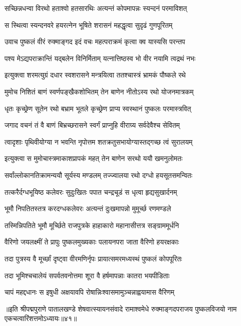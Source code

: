 \twolineshloka
{सच्छिन्नधन्वा विरथो हताश्वो हतसारथिः}
{अत्यन्तं कोपमापन्नः स्यन्दनं परमाविशत्}%

\twolineshloka
{स स्थित्वा स्यन्दनवरे हयरत्नेन भूषिते}
{शरासनं महद्धृत्वा सुदृढं गुणपूरितम्}%

\twolineshloka
{उवाच पुष्कलं वीरं रुक्माङ्गद इदं वचः}
{महत्पराक्रमं कृत्वा क्व यास्यसि परन्तप}%

\twolineshloka
{पश्य मेऽद्यपराक्रान्तिं यद्बलेन विनिर्मिताम्}
{यत्नात्तिष्ठस्व भो वीर नयामि त्वद्रथं नभः}%

\twolineshloka
{इत्युक्त्वा शरमत्युग्रं दधार स्वशरासने}
{मन्त्रयित्वा ततश्चास्त्रं भ्रामकं पौष्कले रथे}%

\twolineshloka
{मुमोच निशितं बाणं स्वर्णपङ्खैकशोभितम्}
{तेन बाणेन नीतोऽस्य रथो योजनमात्रकम्}%

\twolineshloka
{धृतः कृच्छ्रेण सूतेन रथो बभ्राम भूतले}
{कृच्छ्रेण प्राप्य स्वस्थानं पुष्कलः परमास्त्रवित्}%

\twolineshloka
{जगाद वचनं तं वै बाणं बिभ्रच्छरासने}
{स्वर्गं प्राप्नुहि वीराग्र्य सर्वदेवैश्च सेवितम्}%

\twolineshloka
{त्वादृशाः पृथिवीयोग्या न भवन्ति नृपोत्तम}
{शतक्रतुसभायोग्यास्तद्गच्छ त्वं सुरालयम्}%

\twolineshloka
{इत्युक्त्वा स मुमोचास्त्रमाकाशप्रापकं महत्}
{तेन बाणेन सरथो ययौ खमनुलोमतः}%

\twolineshloka
{सर्वांल्लोकानतिक्रामन्ययौ सूर्यस्य मण्डलम्}
{तज्ज्वालया रथो दग्धो हयसूतसमन्वितः}%

\twolineshloka
{तत्करैर्दग्धभूयिष्ठ कलेवरः सुदुःखितः}
{पपात चन्द्रचूडं स धृत्वा हृद्यसुखार्दनम्}%

\twolineshloka
{भूमौ निपतितस्तत्र करदग्धकलेवरः}
{अत्यन्तं दुःखमापन्नो मुमूर्च्छ रणमण्डले}%

\twolineshloka
{तस्मिन्निपतिते भूमौ मूर्च्छिते राजपुत्रके}
{हाहाकारो महानासीत्तत्र सङ्ग्राममूर्धनि}%

\twolineshloka
{वैरिणो जयलक्ष्मीं ते प्रापुः पुष्कलमुख्यकाः}
{पलायनपरा जाता वैरिणो हयरक्षकाः}%

\twolineshloka
{तदा पुत्रस्य वै मूर्च्छां दृष्ट्वा वीरमणिर्नृपः}
{प्रायात्समरमध्यस्थं पुष्कलं कोपपूरितः}%

\twolineshloka
{तदा भूमिश्चचालेयं सपर्वतवनोत्तमा}
{शूरा वै हर्षमापन्नाः कातरा भयपीडिताः}%

\twolineshloka
{चापं महद्दधानः स इषुधी अक्षयावपि}
{रोषान्निःश्वासमामुञ्चन्नाह्वयामास वैरिणम्}%

{॥इति श्रीपद्मपुराणे पातालखण्डे शेषवात्स्यायनसंवादे रामाश्वमेधे रुक्माङ्गदपराजय पुष्कलविजयो नाम एकचत्वारिंशत्तमोऽध्यायः॥४१॥}

